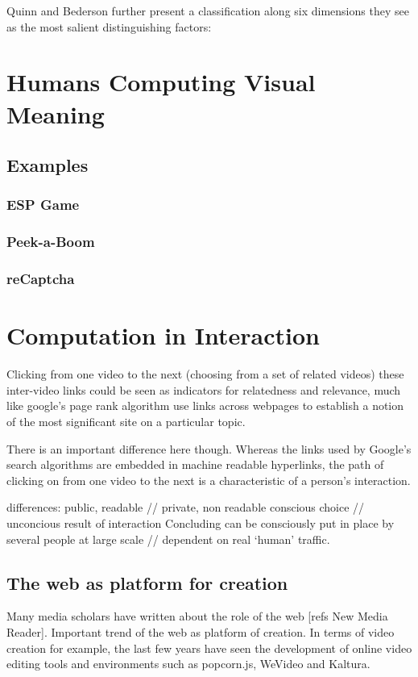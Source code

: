 Quinn and Bederson further present a classification along six dimensions they see as the most salient distinguishing factors: \cite{Quinn:2011us}


\section{Humans Computing Visual Meaning}
\subsection{Examples}
\subsubsection{ESP Game}
\subsubsection{Peek-a-Boom}
\subsubsection{reCaptcha}




\section{Computation in Interaction}
Clicking from one video to the next (choosing from a set of related videos)
these inter-video links could be seen as indicators for relatedness and relevance, much like google's page rank algorithm use links across webpages to establish a notion of the most significant site on a particular topic. 

There is an important difference here though. Whereas the links used by Google's search algorithms are embedded in machine readable hyperlinks, the path of clicking on from one video to the next is a characteristic of a person's interaction. 

differences:
	public, readable // private, non readable
	conscious choice // unconcious result of interaction
	Concluding
		can be consciously put in place by several people at large scale // dependent on real `human' traffic.



\subsection{The web as platform for creation}
\label{sec:platform}
Many media scholars have written about the role of the web [refs New Media Reader].
Important trend of the web as platform of creation. In terms of video creation for example, the last few years have seen the development of online video editing tools and environments such as popcorn.js, WeVideo and Kaltura.




